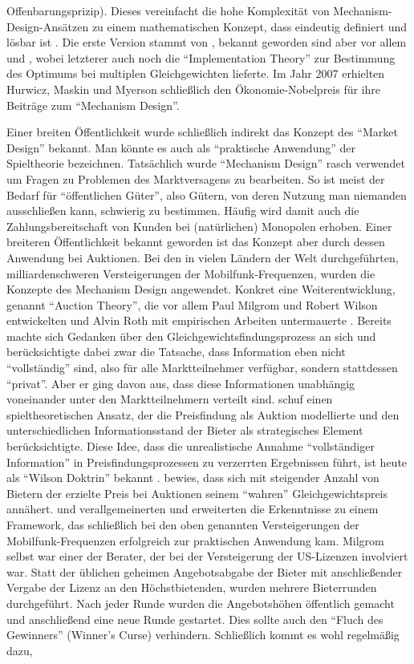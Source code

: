 Offenbarungsprizip). Dieses vereinfacht die hohe Komplexität von Mechanism-Design-Ansätzen zu einem mathematischen Konzept, dass eindeutig definiert und lösbar ist \parencite[S. 3]{Nobelpreis-Komitee2007}. Die erste Version stammt von \textcite{Gibbard1973}, bekannt geworden sind aber vor allem \textcite{Myerson1979} und \textcite{Maskin1979}, wobei letzterer auch noch die "`Implementation Theory"' zur Bestimmung des Optimums bei multiplen Gleichgewichten lieferte. Im Jahr 2007 erhielten Hurwicz, Maskin und Myerson schließlich den Ökonomie-Nobelpreis für ihre Beiträge zum "`Mechanism Design"'.

Einer breiten Öffentlichkeit wurde schließlich indirekt das Konzept des "`Market Design"' bekannt. Man könnte es auch als "`praktische Anwendung"' der Spieltheorie bezeichnen. Tatsächlich wurde "`Mechanism Design"' rasch verwendet um Fragen zu Problemen des Marktversagens zu bearbeiten. So ist meist der Bedarf für "`öffentlichen Güter"', also Gütern, von deren Nutzung man niemanden ausschließen kann, schwierig zu bestimmen. Häufig wird damit auch die Zahlungsbereitschaft von Kunden bei (natürlichen) Monopolen erhoben. Einer breiteren Öffentlichkeit bekannt geworden ist das Konzept aber durch dessen Anwendung bei Auktionen. Bei den in vielen Ländern der Welt durchgeführten, milliardenschweren Versteigerungen der Mobilfunk-Frequenzen, wurden die Konzepte des Mechanism Design angewendet. Konkret eine Weiterentwicklung, genannt "`Auction Theory"', die vor allem Paul Milgrom und Robert Wilson entwickelten und Alvin Roth mit empirischen Arbeiten untermauerte \parencite{Roth2019}. Bereits \textcite{Vickrey1961} machte sich Gedanken über den Gleichgewichtsfindungsprozess an sich und berücksichtigte dabei zwar die Tatsache, dass Information eben nicht "`vollständig"' sind, also für alle Marktteilnehmer verfügbar, sondern stattdessen "`privat"'. Aber er ging davon aus, dass diese Informationen unabhängig voneinander unter den Marktteilnehmern verteilt sind. \textcite{Wilson1967, Wilson1969} schuf einen spieltheoretischen Ansatz, der die Preisfindung als Auktion modellierte und den unterschiedlichen Informationsstand der Bieter als strategisches Element berücksichtigte. Diese Idee, dass die unrealistische Annahme "`vollständiger Information"' in Preisfindungsprozessen zu verzerrten Ergebnissen führt, ist heute als "`Wilson Doktrin"' bekannt \parencite{Roth2019}. \textcite{Wilson1977} bewies, dass sich mit steigender Anzahl von Bietern der erzielte Preis bei Auktionen seinem "`wahren"' Gleichgewichtspreis annähert. \textcite{Milgrom1979, Milgrom1981} und \textcite{Milgrom1982} verallgemeinerten und erweiterten die Erkenntnisse zu einem Framework, das schließlich bei den oben genannten Versteigerungen der Mobilfunk-Frequenzen erfolgreich zur praktischen Anwendung kam. Milgrom selbst war einer der Berater, der bei der Versteigerung der US-Lizenzen involviert war. Statt der üblichen geheimen Angebotsabgabe der Bieter mit anschließender Vergabe der Lizenz an den Höchstbietenden, wurden mehrere Bieterrunden durchgeführt. Nach jeder Runde wurden die Angebotshöhen öffentlich gemacht und anschließend eine neue Runde gestartet. Dies sollte auch den "`Fluch des Gewinners"' (Winner's Curse) verhindern. Schließlich kommt es wohl regelmäßig dazu, 